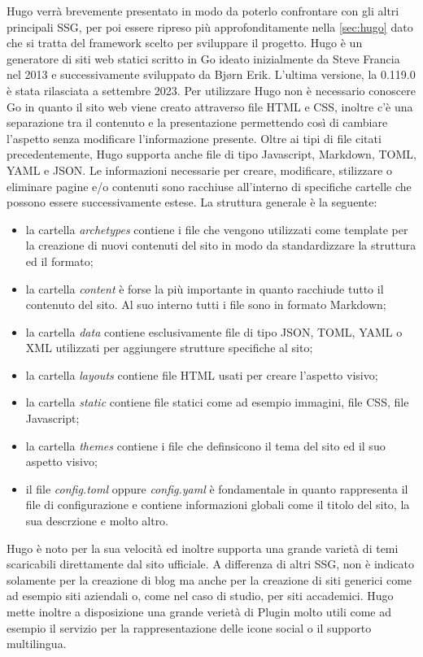 \documentclass[target=bach,aauheader=]{thud}
\begin{document}
Hugo verrà brevemente presentato in modo da poterlo confrontare con gli altri principali SSG, per poi essere ripreso più approfonditamente nella \cref{sec:hugo} dato che si tratta del framework scelto per sviluppare il progetto. \newline
Hugo è un generatore di siti web statici scritto in Go ideato inizialmente da Steve Francia nel 2013 e successivamente sviluppato da Bjørn Erik. L'ultima versione, la 0.119.0 è stata rilasciata a settembre 2023.
Per utilizzare Hugo non è necessario conoscere Go in quanto il sito web viene creato attraverso file HTML e CSS, inoltre c'è una separazione tra il contenuto e la presentazione permettendo così di cambiare l'aspetto senza modificare l'informazione presente. 
Oltre ai tipi di file citati precedentemente, Hugo supporta anche file di tipo Javascript, Markdown, TOML, YAML e JSON. \newline
Le informazioni necessarie per creare, modificare, stilizzare o eliminare pagine e/o contenuti sono racchiuse all'interno di specifiche cartelle che possono essere successivamente estese. La struttura generale è la seguente:
\begin{itemize}
    \item la cartella \textit{archetypes} contiene i file che vengono utilizzati come template per la creazione di nuovi contenuti del sito in modo da standardizzare la struttura ed il formato;
    \item la cartella \textit{content} è forse la più importante in quanto racchiude tutto il contenuto del sito. Al suo interno tutti i file sono in formato Markdown;
    \item la cartella \textit{data} contiene esclusivamente file di tipo JSON, TOML, YAML o XML utilizzati per aggiungere strutture specifiche al sito;
    \item la cartella \textit{layouts} contiene file HTML usati per creare l'aspetto visivo;
    \item la cartella \textit{static} contiene file statici come ad esempio immagini, file CSS, file Javascript;
    \item la cartella \textit{themes} contiene i file che definsicono il tema del sito ed il suo aspetto visivo;
    \item il file \textit{config.toml} oppure \textit{config.yaml} è fondamentale in quanto rappresenta il file di configurazione e contiene informazioni globali come il titolo del sito, la sua descrzione e molto altro.
\end{itemize}
Hugo è noto per la sua velocità ed inoltre supporta una grande varietà di temi scaricabili direttamente dal sito ufficiale. A differenza di altri SSG, non è indicato solamente per la creazione di blog
ma anche per la creazione di siti generici come ad esempio siti aziendali o, come nel caso di studio, per siti accademici. 
Hugo mette inoltre a disposizione una grande verietà di Plugin molto utili come ad esempio il servizio per la rappresentazione delle icone social o il supporto multilingua. 
\end{document}
